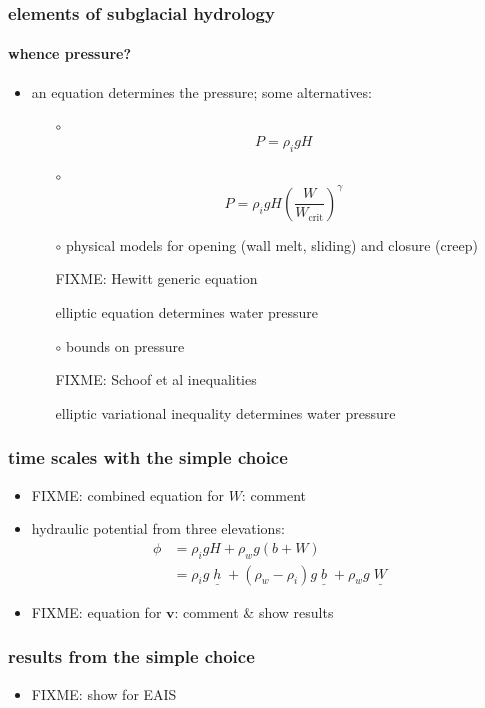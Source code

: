 \documentclass[hide notes,intlimits]{beamer}
\begin{document}
\begin{frame}
  \frametitle{elements of subglacial hydrology}
  \framesubtitle{whence pressure?}

  \begin{itemize}
    \item an equation determines the pressure; some alternatives:
      \begin{itemize}
      \item[$\circ$]
        $$P = \rho_i g H$$
      \item[$\circ$]
        $$P = \rho_i g H \left(\frac{W}{W_{\text{crit}}}\right)^\gamma$$
      \item[$\circ$]  physical models for opening (wall melt, sliding) and closure (creep)
        
        FIXME: Hewitt generic equation

  elliptic equation determines water pressure

      \item[$\circ$] bounds on pressure
        
        FIXME: Schoof et al inequalities

  elliptic variational inequality determines water pressure
      \end{itemize}
  \end{itemize}

\end{frame}


\begin{frame}
  \frametitle{time scales with the simple choice}

  \begin{itemize}
    \item FIXME: combined equation for $W$: comment
    \item hydraulic potential from three elevations:
    \begin{align*}
      \phi &= \rho_i g H + \rho_w g (b+W) \\
           &= \rho_i g \underline{\phantom{|}h\phantom{|}} + (\rho_w - \rho_i) g \underline{\phantom{|}b\phantom{|}} + \rho_w g \underline{\phantom{|}W\phantom{|}}
    \end{align*}
    \item FIXME: equation for $\mathbf{v}$: comment \& show results
  \end{itemize}

\end{frame}


\begin{frame}
  \frametitle{results from the simple choice}

  \begin{itemize}
    \item FIXME: show for EAIS
  \end{itemize}

\end{frame}
\end{document}
